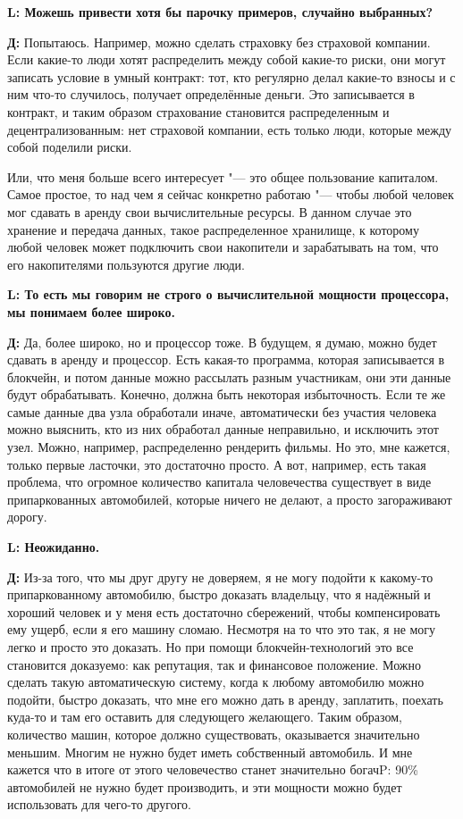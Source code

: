 \documentclass[10pt, a5paper]{article}
\begin{document}
{\noindent \bf L: Можешь привести хотя бы парочку примеров, случайно выбранных?}

{\noindent \bf Д:} Попытаюсь. Например, можно сделать страховку без страховой компании. Если какие-то люди хотят распределить между собой какие-то риски, они могут записать условие в умный контракт: тот, кто регулярно делал какие-то взносы и с ним что-то случилось, получает определённые деньги. Это записывается в контракт, и таким образом страхование становится распределенным и децентрализованным: нет страховой компании, есть только люди, которые между собой поделили риски. 

Или, что меня больше всего интересует "--- это общее пользование капиталом. Самое простое, то над чем я сейчас конкретно работаю "--- чтобы любой человек мог сдавать в аренду свои вычислительные ресурсы. В данном случае это хранение и передача данных,  такое распределенное хранилище, к которому любой человек может подключить свои накопители и зарабатывать на том, что его накопителями пользуются другие люди.

{\noindent \bf L: То есть мы говорим не строго о вычислительной мощности процессора, мы понимаем более широко.}

{\noindent \bf Д:} Да, более широко, но и процессор тоже. В будущем, я думаю, можно будет сдавать в аренду и процессор. Есть какая-то программа, которая записывается в блокчейн, и потом данные можно рассылать разным участникам, они эти данные будут обрабатывать. Конечно, должна быть некоторая избыточность. Если те же  самые данные два узла обработали иначе, автоматически без участия человека можно выяснить, кто из них обработал данные неправильно, и исключить этот узел. Можно, например, распределенно рендерить фильмы. Но это, мне кажется, только первые ласточки, это достаточно просто. А вот, например, есть такая проблема, что огромное количество капитала человечества существует в виде припаркованных автомобилей, которые ничего не делают, а просто загораживают дорогу.

{\noindent \bf L: Неожиданно.}

{\noindent \bf Д:} Из-за того, что мы друг другу не доверяем, я не могу подойти к какому-то припаркованному автомобилю, быстро доказать владельцу, что я надёжный и хороший человек и у меня есть достаточно сбережений, чтобы компенсировать ему ущерб, если я его машину сломаю. Несмотря на то что это так, я не могу легко и просто это доказать. Но при помощи блокчейн-технологий это все становится доказуемо: как репутация, так и финансовое положение. Можно сделать такую автоматическую систему, когда к любому автомобилю можно подойти, быстро доказать, что мне его можно дать в аренду, заплатить, поехать куда-то и там его оставить для следующего желающего. Таким образом, количество машин, которое должно существовать, оказывается значительно меньшим. Многим не нужно будет иметь собственный автомобиль. И мне кажется что в итоге от этого человечество станет значительно богачP:  90\% автомобилей не нужно будет производить, и эти мощности можно будет использовать для чего-то другого.
\end{document}

